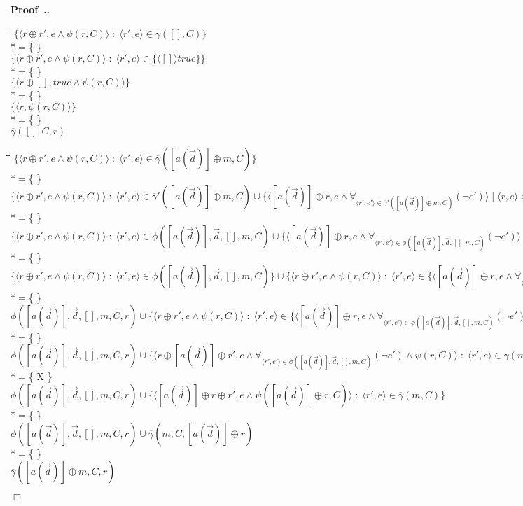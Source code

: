 \documentclass[a4paper,twoside]{article}
\def\vec#1{\overrightarrow{#1}}		%
\def\mset#1{[#1]}
\def\tup#1{\langle #1\rangle}
\newcounter{theoremcnt}[section]
\renewcommand{\thetheoremcnt}{\thesection.\arabic{theoremcnt}}
\newenvironment{Proof}%
{\begin{trivlist}\item[]\bf Proof~\thetheoremcnt.~\rm}{\hfill$\Box$\end{trivlist}}
\newenvironment{derivation}
{\par\addtolength{\baselineskip}{1mm}\begin{tabbing}\hspace{5mm}\=\hspace{5mm}\=\hspace{5mm}\=\kill}{\end{tabbing}}
\newcommand{\expr}[1]{\>\>$#1$}
\newcommand{\tran}[2]{\\*\>$#1$\>\>\{ #2 \}\\}
\begin{document}
\begin{Proof}
\begin{derivation}
\expr{\{ \tup{ r\oplus r' , e \land \psi(r,C) } \;:\; \tup{r',e} \in \overline{\gamma}([],C) \}}
\tran{=}{}
\expr{\{ \tup{ r\oplus r' ,  e \land \psi(r,C) } \;:\; \tup{r',e} \in \{ \tup{[]}{\mathit{true}} \} \}}
\tran{=}{}
\expr{\{ \tup{ r\oplus [] , \mathit{true} \land \psi(r,C) } \}}
\tran{=}{}
\expr{\{ \tup{ r , \psi(r,C) } \}}
\tran{=}{}
\expr{\overline{\gamma}([],C,r)}
\end{derivation}
\begin{derivation}
\expr{\{ \tup{ r\oplus r' , e \land \psi(r,C) } \;:\; \tup{r',e} \in \overline{\gamma}([a(\vec{d})]\oplus m,C) \}}
\tran{=}{}
\expr{\{ \tup{ r\oplus r' , e \land \psi(r,C) } \;:\; \tup{r',e} \in \overline{\gamma}'(\mset{a(\vec{d})}\oplus m,C)\cup\{\tup{\mset{a(\vec{d})}\oplus r,e\land\forall_{\tup{r',e'}\in\overline{\gamma}'(\mset{a(\vec{d})}\oplus m,C)}(\neg e')}\;|\;\tup{r,e}\in\overline{\gamma}(m,C)\} \}}
\tran{=}{}
\expr{\{ \tup{ r\oplus r' , e \land \psi(r,C) } \;:\; \tup{r',e} \in \phi(\mset{a(\vec{d})},\vec{d},[],m,C)\cup\{\tup{\mset{a(\vec{d})}\oplus r,e\land\forall_{\tup{r',e'}\in\phi(\mset{a(\vec{d})},\vec{d},[],m,C)}(\neg e')}\;|\;\tup{r,e}\in\overline{\gamma}(m,C)\} \}}
\tran{=}{}
\expr{\{ \tup{ r\oplus r' , e \land \psi(r,C) } \;:\; \tup{r',e} \in \phi(\mset{a(\vec{d})},\vec{d},[],m,C) \} \cup \{ \tup{ r\oplus r' , e \land \psi(r,C) } \;:\; \tup{r',e} \in \{\tup{\mset{a(\vec{d})}\oplus r,e\land\forall_{\tup{r',e'}\in\phi(\mset{a(\vec{d})},\vec{d},[],m,C)}(\neg e')}\;|\;\tup{r,e}\in\overline{\gamma}(m,C)\} \}}
\tran{=}{}
\expr{\phi(\mset{a(\vec{d})},\vec{d},[],m,C,r) \cup \{ \tup{ r\oplus r' , e \land \psi(r,C) } \;:\; \tup{r',e} \in \{\tup{\mset{a(\vec{d})}\oplus r,e\land\forall_{\tup{r',e'}\in\phi(\mset{a(\vec{d})},\vec{d},[],m,C)}(\neg e')}\;|\;\tup{r,e}\in\overline{\gamma}(m,C)\} \}}
\tran{=}{}
\expr{\phi(\mset{a(\vec{d})},\vec{d},[],m,C,r) \cup \{ \tup{ r\oplus \mset{a(\vec{d})}\oplus r' , e \land \forall_{\tup{r',e'}\in\phi(\mset{a(\vec{d})},\vec{d},[],m,C)}(\neg e') \land \psi(r,C) } \;:\; \tup{r',e} \in \overline{\gamma}(m,C) \}}
\tran{=}{X}
\expr{\phi(\mset{a(\vec{d})},\vec{d},[],m,C,r) \cup \{ \tup{ \mset{a(\vec{d})}\oplus r\oplus r' , e \land \psi(\mset{a(\vec{d})}\oplus r,C) } \;:\; \tup{r',e} \in \overline{\gamma}(m,C) \}}
\tran{=}{}
\expr{\phi(\mset{a(\vec{d})},\vec{d},[],m,C,r) \cup \overline{\gamma}(m,C,[a(\vec{d})]\oplus r)}
\tran{=}{}
\expr{\overline{\gamma}([a(\vec{d})]\oplus m,C,r)}
\end{derivation}
\end{Proof}
\end{document}
